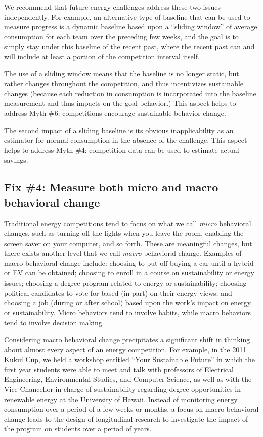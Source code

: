 \documentclass[jou]{apa} %
\begin{document}
We recommend that future energy challenges address these two issues independently.  For
example, an alternative type of baseline that can be used to measure progress is a dynamic
baseline based upon a ``sliding window'' of average consumption for each team over the
preceding few weeks, and the goal is to simply stay under this baseline of the recent past,
where the recent past can and will include at least a portion of the competition interval itself.

The use of a sliding window means that the baseline is no longer static, but rather
changes throughout the competition, and thus incentivizes sustainable changes (because each
reduction in consumption is incorporated into the baseline measurement and thus impacts on 
the goal behavior.)  This aspect helps to address Myth \#6: competitions encourage sustainable
behavior change.

The second impact of a sliding baseline is its obvious inapplicability as an estimator for
normal consumption in the absence of the challenge.  This aspect helps to address Myth \#4:
competition data can be used to estimate actual savings.


\subsection{Fix \#4: Measure both micro and macro behavioral change}

Traditional energy competitions tend to focus on what we call \emph{micro} behavioral
changes, such as turning off the lights when you leave the room, enabling the screen saver
on your computer, and so forth.  These are meaningful changes, but there exists another
level that we call \emph{macro} behavioral change.  Examples of macro behavioral change
include: choosing to put off buying a car until a hybrid or EV can be obtained; choosing
to enroll in a course on sustainability or energy issues; choosing a degree program
related to energy or sustainability; choosing political candidates to vote for based (in
part) on their energy views; and choosing a job (during or after school) based upon the
work's impact on energy or sustainability.  Micro behaviors tend to involve habits, while
macro behaviors tend to involve decision making.

Considering macro behavioral change precipitates a significant shift in thinking about
almost every aspect of an energy competition.  For example, in the 2011 Kukui Cup, we held
a workshop entitled ``Your Sustainable Future'' in which the first year students were able
to meet and talk with professors of Electrical Engineering, Environmental Studies, and
Computer Science, as well as with the Vice Chancellor in charge of sustainability
regarding degree opportunities in renewable energy at the University of Hawaii.  Instead
of monitoring energy consumption over a period of a few weeks or months, a focus on macro
behavioral change leads to the design of longitudinal research to investigate the impact
of the program on students over a period of years.
\end{document}
